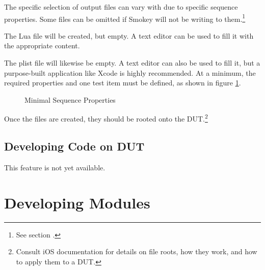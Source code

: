 The specific selection of output files can vary with due to specific sequence
properties.  Some files can be omitted if Smokey will not be writing to
them.\footnote{See section .}

The Lua file will be created, but empty.  A text editor can be used to fill it
with the appropriate content.

The plist file will likewise be empty.  A text editor can also be used to fill
it, but a purpose-built application like Xcode is highly recommended.  At a
minimum, the required properties and one test item must be defined, as shown in
figure \ref{fig:MinimalSeqProps}.

\begin{figure}[h]

	\begin{CenteredPropertyList}{20em}
	\end{CenteredPropertyList}

	\caption{Minimal Sequence Properties}
	\label{fig:MinimalSeqProps}

\end{figure}

Once the files are created, they should be rooted onto the
DUT.\footnote{Consult iOS documentation for details on file roots, how they
work, and how to apply them to a DUT.}

\subsection{Developing Code on DUT}

This feature is not yet available.


\section{Developing Modules}

% 

